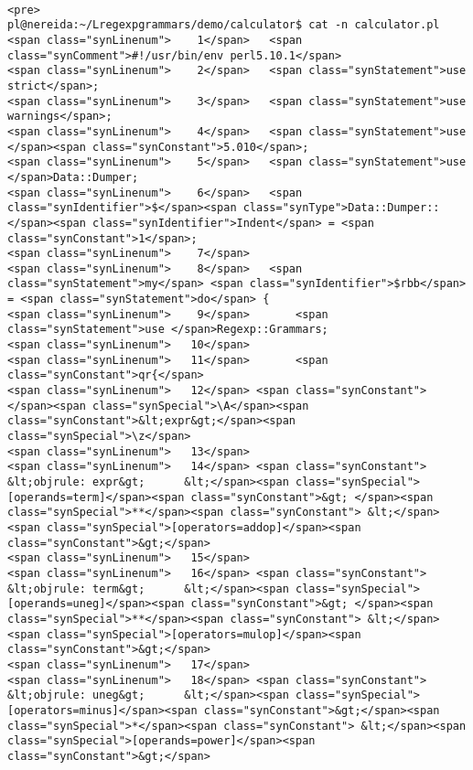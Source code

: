 \begin{verbatim}

<pre>
pl@nereida:~/Lregexpgrammars/demo/calculator$ cat -n calculator.pl
<span class="synLinenum">    1</span>   <span class="synComment">#!/usr/bin/env perl5.10.1</span>
<span class="synLinenum">    2</span>   <span class="synStatement">use strict</span>;
<span class="synLinenum">    3</span>   <span class="synStatement">use warnings</span>;
<span class="synLinenum">    4</span>   <span class="synStatement">use </span><span class="synConstant">5.010</span>;
<span class="synLinenum">    5</span>   <span class="synStatement">use </span>Data::Dumper;
<span class="synLinenum">    6</span>   <span class="synIdentifier">$</span><span class="synType">Data::Dumper::</span><span class="synIdentifier">Indent</span> = <span class="synConstant">1</span>;
<span class="synLinenum">    7</span> 
<span class="synLinenum">    8</span>   <span class="synStatement">my</span> <span class="synIdentifier">$rbb</span> = <span class="synStatement">do</span> {
<span class="synLinenum">    9</span>       <span class="synStatement">use </span>Regexp::Grammars;
<span class="synLinenum">   10</span> 
<span class="synLinenum">   11</span>       <span class="synConstant">qr{</span>
<span class="synLinenum">   12</span> <span class="synConstant">        </span><span class="synSpecial">\A</span><span class="synConstant">&lt;expr&gt;</span><span class="synSpecial">\z</span>
<span class="synLinenum">   13</span> 
<span class="synLinenum">   14</span> <span class="synConstant">        &lt;objrule: expr&gt;      &lt;</span><span class="synSpecial">[operands=term]</span><span class="synConstant">&gt; </span><span class="synSpecial">**</span><span class="synConstant"> &lt;</span><span class="synSpecial">[operators=addop]</span><span class="synConstant">&gt;</span>
<span class="synLinenum">   15</span> 
<span class="synLinenum">   16</span> <span class="synConstant">        &lt;objrule: term&gt;      &lt;</span><span class="synSpecial">[operands=uneg]</span><span class="synConstant">&gt; </span><span class="synSpecial">**</span><span class="synConstant"> &lt;</span><span class="synSpecial">[operators=mulop]</span><span class="synConstant">&gt;</span>
<span class="synLinenum">   17</span> 
<span class="synLinenum">   18</span> <span class="synConstant">        &lt;objrule: uneg&gt;      &lt;</span><span class="synSpecial">[operators=minus]</span><span class="synConstant">&gt;</span><span class="synSpecial">*</span><span class="synConstant"> &lt;</span><span class="synSpecial">[operands=power]</span><span class="synConstant">&gt;</span>

\end{verbatim}
